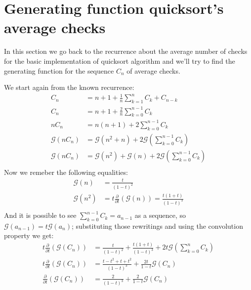 
\section{Generating function quicksort's average checks }
In this section we go back to the recurrence about the average number
of checks for the basic implementation of quicksort algorithm and
we'll try to find the generating function for the sequence $C_n$ of
average checks.

We start again from the known recurrence:
\begin{displaymath}
  \begin{split}
    C_n &= n+1 +  \frac{1}{n}\sum_{k=1}^{n}{C_k + C_{n-k}}  \\
    C_n &= n+1 +  \frac{2}{n}\sum_{k=0}^{n-1}{C_k}  \\
    nC_n &= n(n+1) + 2\sum_{k=0}^{n-1}{C_k}  \\
    \mathcal{G} (nC_n) &= \mathcal{G} (n^2+n) +
    2\mathcal{G} \left(\sum_{k=0}^{n-1}{C_k} \right) \\
    \mathcal{G} (nC_n) &= \mathcal{G} (n^2) +\mathcal{G} (n) +
    2\mathcal{G} \left(\sum_{k=0}^{n-1}{C_k} \right) \\
  \end{split}
\end{displaymath}
Now we remeber the following equalities:
\begin{displaymath}
  \begin{split}
    \mathcal{G} (n) &=  \frac{t}{(1-t)^2} \\
    \mathcal{G} (n^2) &=
    t\frac{\partial}{\partial t}(\mathcal{G} (n)) =
    \frac{t(1+t)}{(1-t)^3} \\
  \end{split}
\end{displaymath}
And it is possible to see $\sum_{k=0}^{n-1}{C_k} = a_{n-1}$ as a
sequence, so $\mathcal{G} (a_{n-1}) = t \mathcal{G} (a_n)$;
substituting those rewritings and using the convolution property we
get:
\begin{displaymath}
  \begin{split}
    t \frac{\partial}{\partial t}\left( \mathcal{G} (C_n) \right) &=
    \frac{t}{(1-t)^2} + \frac{t(1+t)}{(1-t)^3} + 2t\mathcal{G}
    \left(\sum_{k=0}^{n}{C_k} \right)\\
    t \frac{\partial}{\partial t}\left( \mathcal{G} (C_n) \right) &=
    \frac{t -t^2+ t+t^2}{(1-t)^3} + \frac{2t}{1-t} \mathcal{G}
    \left(C_n \right)\\
    \frac{\partial}{\partial t}\left( \mathcal{G} (C_n) \right) &=
    \frac{2}{(1-t)^3} + \frac{2}{1-t} \mathcal{G}
    \left(C_n \right)\\
  \end{split}
\end{displaymath}

